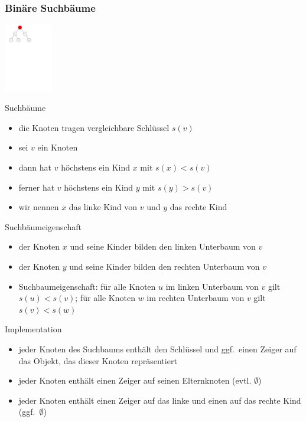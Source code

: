 \documentclass[aspectratio=1610, 11pt]{beamer}
\newcommand{\mytitle}{Bin\"are Suchb\"aume}
\begin{document}
\begin{frame}\frametitle{\mytitle}
	\hfill\includegraphics[height=30mm]{./images/binary_searchtree.pdf}
	\begin{overprint}
		\begin{exampleblock}{Suchb\"aume}
			\begin{itemize}
				\item die Knoten tragen vergleichbare \alert{Schl\"ussel} $s(v)$
				\item sei $v$ ein Knoten
				\item dann hat $v$ h\"ochstens ein Kind $x$ mit $s(x)<s(v)$
				\item ferner hat $v$ h\"ochstens ein Kind $y$ mit $s(y)>s(v)$
				\item wir nennen $x$ das \alert{linke Kind} von $v$ und $y$ das \alert{rechte Kind}
			\end{itemize}
		\end{exampleblock}
		\begin{exampleblock}{Suchb\"aumeigenschaft}
			\begin{itemize}
				\item der Knoten $x$ und seine Kinder bilden den \alert{linken Unterbaum} von $v$
				\item der Knoten $y$ und seine Kinder bilden den \alert{rechten Unterbaum} von $v$
				\item \alert{Suchbaumeigenschaft:} f\"ur alle Knoten $u$ im linken Unterbaum von $v$ gilt $s(u)<s(v)$; f\"ur alle Knoten $w$ im rechten Unterbaum von $v$ gilt $s(v)<s(w)$
			\end{itemize}
		\end{exampleblock}
		\begin{exampleblock}{Implementation}
			\begin{itemize}
				\item jeder Knoten des Suchbaums enth\"alt den Schl\"ussel und ggf.\ einen Zeiger auf das Objekt, das dieser Knoten repr\"asentiert
				\item jeder Knoten enth\"alt einen Zeiger auf seinen Elternknoten (evtl. $\emptyset$)
				\item jeder Knoten enth\"alt einen Zeiger auf das linke und einen auf das rechte Kind (ggf.\ $\emptyset$)
			\end{itemize}
		\end{exampleblock}
	\end{overprint}
\end{frame}
\end{document}
